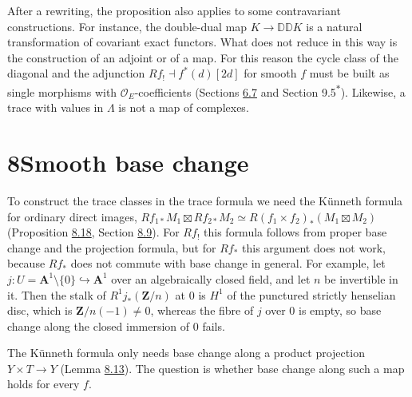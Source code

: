 \documentclass[11pt]{article}
\newcommand{\bpout}[1]{#1\textsuperscript{\hyperlink{bp-outside}{\ensuremath{\ast}}}}
\begin{document}
\label{bp636}%
After a rewriting, the proposition also applies to some contravariant constructions. For instance, the double-dual map \(K\to\mathbb D\mathbb DK\) is a natural transformation of covariant exact functors. What does not reduce in this way is the construction of an adjoint or of a map. For this reason the cycle class of the diagonal and the adjunction \(Rf_!\dashv f^*(d)[2d]\) for smooth \(f\) must be built as single morphisms with \(\mathcal O_E\)-coefficients (Sections \hyperref[bp575]{6.7} and \bpout{Section 9.5}). Likewise, a trace with values in \(\Lambda\) is not a map of complexes.



\section*{\texorpdfstring{8\quad Smooth base change}{8 Smooth base change}}
\label{bp637}%
\label{bp638}%
To construct the trace classes in the trace formula we need the Künneth formula for ordinary direct images, \(Rf_{1*}M_1\boxtimes Rf_{2*}M_2\simeq R(f_1\times f_2)_*(M_1\boxtimes M_2)\) (Proposition \hyperref[bp700]{8.18}, Section \hyperref[bp685]{8.9}). For \(Rf_!\) this formula follows from proper base change and the projection formula, but for \(Rf_*\) this argument does not work, because \(Rf_*\) does not commute with base change in general. For example, let \(j:U=\mathbf A^1\setminus\{0\}\hookrightarrow\mathbf A^1\) over an algebraically closed field, and let \(n\) be invertible in it. Then the stalk of \(R^1j_*(\mathbf Z/n)\) at \(0\) is \(H^1\) of the punctured strictly henselian disc, which is \(\mathbf Z/n(-1)\neq0\), whereas the fibre of \(j\) over \(0\) is empty, so base change along the closed immersion of \(0\) fails.

The Künneth formula only needs base change along a product projection \(Y\times T\to Y\) (Lemma \hyperref[bp687]{8.13}). The question is whether base change along such a map holds for every \(f\).
\end{document}
